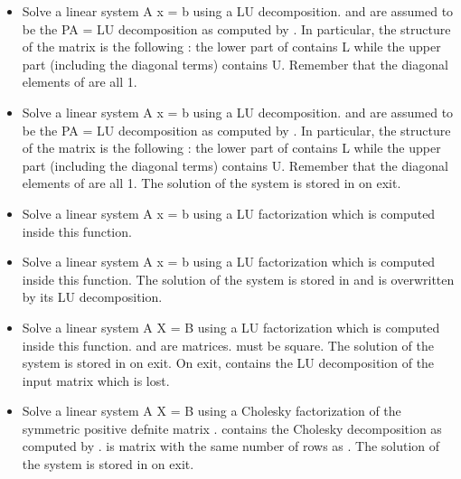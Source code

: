 \begin{itemize}
\item {} 
  \sshortdescribe Solve a linear system A x = b using a LU decomposition.
   and  are assumed to be the PA = LU decomposition as computed
  by . In particular, the structure of the matrix 
  is the following : the lower part of  contains L while the upper part
  (including the diagonal terms) contains U. Remember that the diagonal
  elements of  are all 1.

\item {} 
  \sshortdescribe Solve a linear system A x = b using a LU decomposition.
   and  are assumed to be the PA = LU decomposition as computed
  by . In particular, the structure of the matrix 
  is the following : the lower part of  contains L while the upper part
  (including the diagonal terms) contains U. Remember that the diagonal
  elements of  are all 1. The solution of the system is stored in 
  on exit.
  
\item {} 
  \sshortdescribe Solve a linear system A x = b using a LU factorization
  which is computed inside this function.

\item {} 
  \sshortdescribe Solve a linear system A x = b using a LU factorization
  which is computed inside this function. The solution of the system is stored
  in  and  is overwritten by its LU decomposition.

\item {} 
  \sshortdescribe Solve a linear system A X = B using a LU factorization
  which is computed inside this function.  and   are
  matrices.  must be square. The solution of the system is stored in
   on exit. On exit,  contains the LU decomposition of the input
  matrix which is lost.

\item {}
  \sshortdescribe Solve a linear system A X = B using a Cholesky factorization
  of the symmetric positive defnite matrix .   contains the
  Cholesky decomposition as computed by .  is matrix
  with the same number of rows as . The solution of
  the system is stored in  on exit. 


\end{itemize}
